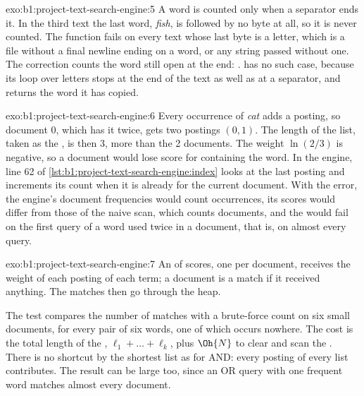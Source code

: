 \begin{solution}{exo:b1:project-text-search-engine:5}
A word is counted only when a separator ends it. In the third text the last word, \emph{fish}, is followed by no byte
at all, so it is never counted. The function fails on every text whose last byte is a letter, which is a file without
a final newline ending on a word, or any string passed without one. The correction counts the word still open at the
end: .  has no such case, because its loop over letters stops at the end of
the text as well as at a separator, and returns the word it has copied.
\end{solution}

\begin{solution}{exo:b1:project-text-search-engine:6}
Every occurrence of \emph{cat} adds a posting, so document 0, which has it twice, gets two postings $(0, 1)$. The
length of the list, taken as the , is then 3, more than the 2 documents. The weight $\ln(2/3)$ is
negative, so a document would lose score for containing the word. In the engine, line 62 of
\cref{lst:b1:project-text-search-engine:index} looks at the last posting and increments its count when it is already
for the current document. With the error, the engine's document frequencies would count occurrences, its scores would
differ from those of the naive scan, which counts documents, and the  would fail on the first query
of a word used twice in a document, that is, on almost every query.
\end{solution}

\begin{solution}{exo:b1:project-text-search-engine:7}
An  of scores, one per document, receives the weight of each posting of each term; a document is a match if it
received anything. The matches then go through the heap.


The test  compares the number of matches with a brute-force count on six small documents,
for every pair of six words, one of which occurs nowhere. The cost is the total length of the ,
$\ell_1 + \dots + \ell_k$, plus $\Oh{N}$ to clear and scan the . There is no shortcut by the shortest list as for
AND: every posting of every list contributes. The result can be large too, since an OR query with one frequent word
matches almost every document.
\end{solution}

